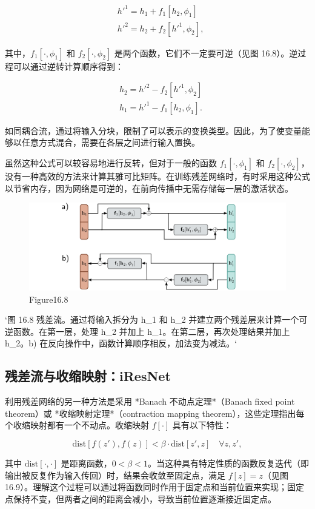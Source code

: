 \begin{align}
&h'^1 = h_1 + f_1[h_2, \phi_1] \\
&h'^2 = h_2 + f_2[h'^1, \phi_2],
\end{align} 


其中，\(f_1[\cdot, \phi_1]\) 和 \(f_2[\cdot, \phi_2]\) 是两个函数，它们不一定要可逆（见图 16.8）。逆过程可以通过逆转计算顺序得到：


\begin{align}
&h_2 = h'^2 - f_2[h'^1, \phi_2] \\
&h_1 = h'^1 - f_1[h_2, \phi_1].
\end{align} 


如同耦合流，通过将输入分块，限制了可以表示的变换类型。因此，为了使变量能够以任意方式混合，需要在各层之间进行输入置换。

虽然这种公式可以较容易地进行反转，但对于一般的函数 \(f_1[\cdot, \phi_1]\) 和 \(f_2[\cdot, \phi_2]\)，没有一种高效的方法来计算其雅可比矩阵。在训练残差网络时，有时采用这种公式以节省内存，因为网络是可逆的，在前向传播中无需存储每一层的激活状态。

\begin{figure}[h!]
\centering
\includegraphics[width=0.7\linewidth]{png/chapter16/FlowResidual.png}
\caption{Figure16.8}
\end{figure}

`图 16.8 残差流。通过将输入拆分为 h_1 和 h_2 并建立两个残差层来计算一个可逆函数。在第一层，处理 h_2 并加上 h_1。在第二层，再次处理结果并加上 h_2。b) 在反向操作中，函数计算顺序相反，加法变为减法。`

\subsection{残差流与收缩映射：iResNet}
利用残差网络的另一种方法是采用 *Banach 不动点定理*（Banach fixed point theorem）或 *收缩映射定理*（contraction mapping theorem），这些定理指出每个收缩映射都有一个不动点。收缩映射 \(f[\cdot]\) 具有以下特性：

\[
\text{dist} [f(z'), f(z)] < \beta \cdot \text{dist} [z', z] \quad \forall z, z', \tag{16.20}
\]

其中 \(\text{dist}[\cdot,\cdot]\) 是距离函数，\(0 < \beta < 1\)。当这种具有特定性质的函数反复迭代（即输出被反复作为输入传回）时，结果会收敛至固定点，满足 \(f[z] = z\)（见图 16.9）。理解这个过程可以通过将函数同时作用于固定点和当前位置来实现；固定点保持不变，但两者之间的距离会减小，导致当前位置逐渐接近固定点。

